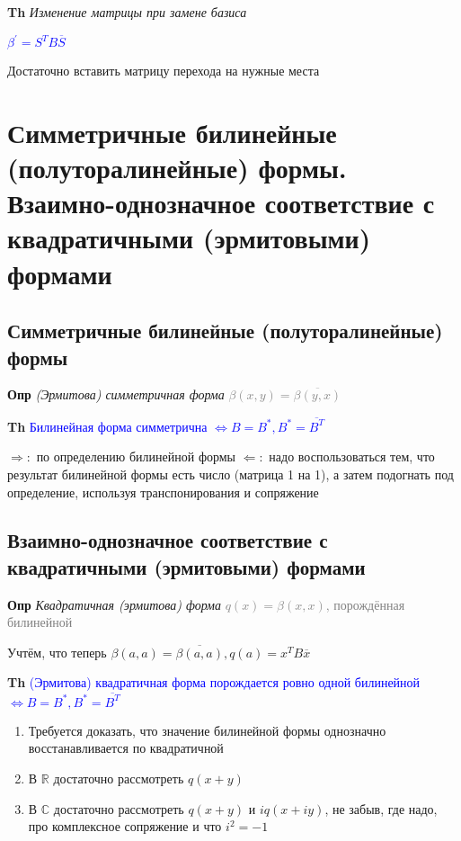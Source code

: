 \documentclass[a4paper, 14pt]{article}
\begin{document}
    \textbf{Th} \textit{Изменение матрицы при замене базиса}

    \textcolor{blue}{$\beta^{'} = S^T B \overline{S}$}

    Достаточно вставить матрицу перехода на нужные места

    \section{Симметричные билинейные (полуторалинейные) формы.
    Взаимно-однозначное соответствие с квадратичными (эрмитовыми) формами}

    \subsection{Симметричные билинейные (полуторалинейные) формы}

    \textbf{Опр} \textit{(Эрмитова) симметричная форма} \textcolor{gray}{$\beta (x, y) = \overline{\beta (y, x)}$}

    \textbf{Th} \textcolor{blue}{Билинейная форма симметрична $\Leftrightarrow B = B^*, B^* = \overline{B^T}$}

    $\Rightarrow:$ по определению билинейной формы
    $\Leftarrow:$ надо воспользоваться тем, что результат билинейной формы есть число (матрица 1 на 1), а затем
    подогнать под определение, используя транспонирования и сопряжение

    \subsection{Взаимно-однозначное соответствие с квадратичными (эрмитовыми) формами}

    \textbf{Опр} \textit{Квадратичная (эрмитова) форма} \textcolor{gray}{$q(x) = \beta (x, x)$, порождённая билинейной}

    Учтём, что теперь $\beta (a, a) = \overline{\beta (a, a)}, q(a) =  x^T B \overline{x}$

    \textbf{Th} \textcolor{blue}{(Эрмитова) квадратичная форма порождается ровно одной билинейной $\Leftrightarrow B
    = B^*, B^* = \overline{B^T}$}

    \begin{enumerate}
        \item Требуется доказать, что значение билинейной формы однозначно восстанавливается по квадратичной
        \item В $\mathbb{R}$ достаточно рассмотреть $q(x + y)$
        \item В $\mathbb{C}$ достаточно рассмотреть $q(x + y)$ и $iq(x + iy)$, не забыв, где надо, про
        комплексное сопряжение и что $i^2 = -1$
    \end{enumerate}
\end{document}
